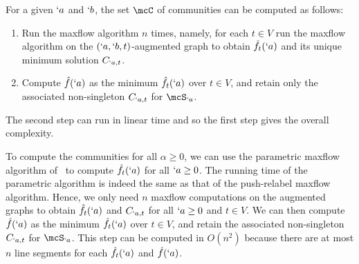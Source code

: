 For a given $`a$ and $`b$, the set $\mcC$ of communities can be computed as follows:
\begin{enumerate}
\item Run the maxflow algorithm $n$ times, namely, for each $t\in V$ run the maxflow algorithm on the $(`a,`b,t)$-augmented graph to obtain $\hat{f}_t(`a)$ and its unique minimum solution $C_{`a,t}$.
\item Compute $\hat{f}(`a)$ as the minimum $\hat{f}_t(`a)$ over $t\in V$, and retain only the associated non-singleton $C_{`a, t}$ for $\mcS_{`a}$. 
\end{enumerate}
The second step can run in linear time and so the first step gives the overall complexity.

To compute the communities for all $\alpha \geq 0$, we can use the parametric maxflow algorithm of~\cite{gallo89} to compute $\hat{f}_t(`a)$ for all $`a\geq 0$. The running time of the parametric algorithm is indeed the same as that of the push-relabel maxflow algorithm. Hence, we only need $n$ maxflow computations on the augmented graphs to obtain $\hat{f}_t(`a)$ and $C_{`a,t}$ for all $`a\geq 0$ and $t\in V$. We can then compute $\hat{f}(`a)$ as the minimum $\hat{f}_t(`a)$ over $t\in V$, and retain the associated non-singleton $C_{`a,t}$ for $\mcS_{`a}$. This step can be computed in $O(n^2)$ because there are at most $n$ line segments for each $\hat{f}_t(`a)$ and $\hat{f}(`a)$. 


